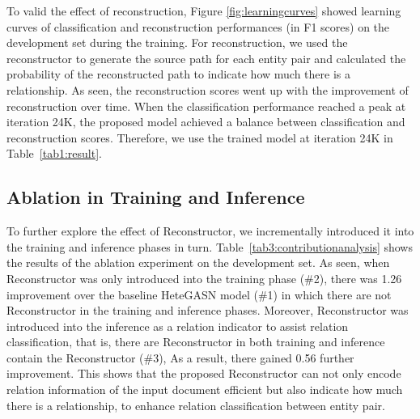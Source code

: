\documentclass[letterpaper]{article} \usepackage{aaai21}  \usepackage{times}  \usepackage{helvet} \usepackage{courier}  \usepackage[hyphens]{url}  \usepackage{graphicx} \urlstyle{rm} \def\UrlFont{\rm}  \usepackage{natbib}  \usepackage{caption} \frenchspacing  \setlength{\pdfpagewidth}{8.5in}  \setlength{\pdfpageheight}{11in}  \usepackage{amsmath}
\begin{document}
To valid the effect of reconstruction, Figure \ref{fig:learningcurves} showed learning curves of classification and reconstruction performances (in F1 scores) on the development set during the training. 
For reconstruction, we used the reconstructor to generate the source path for each entity pair and calculated the probability of the reconstructed path to indicate how much there is a relationship. 
As seen, the reconstruction  scores went up with the improvement of reconstruction over time. 
When the classification performance reached a peak at iteration 24K, the proposed model achieved a balance between classification and reconstruction scores. Therefore, we use the trained model at iteration 24K in Table~\ref{tab1:result}.
\subsection{Ablation in Training and Inference}
\begin{table}[h]
	\begin{center}
	\end{center}
	\caption{\label{tab3:contributionanalysis}Ablation of Reconstructor in training and inference.}
\end{table}
To further explore the effect of Reconstructor, we incrementally introduced it into the training and inference phases in turn.
Table~\ref{tab3:contributionanalysis} shows the results of the ablation experiment on the development set.  
As seen, when Reconstructor was only introduced into the training phase (\#2), there was 1.26  improvement over the baseline HeteGASN model (\#1) in which there are not Reconstructor in the training and inference phases.
Moreover, Reconstructor was introduced into the inference as a relation indicator to assist relation classification, that is, there are Reconstructor in both training and inference contain the Reconstructor (\#3), 
As a result, there gained 0.56  further improvement. 
This shows that the proposed Reconstructor can not only encode relation information of the input document efficient but also indicate how much there is a relationship, to enhance relation classification between entity pair.
\end{document}
